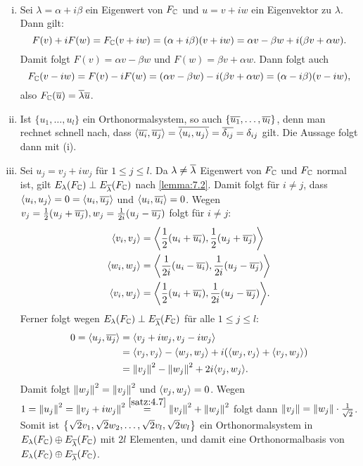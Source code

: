 \begin{beweis}
	\mbox{} \\[-.9cm]
	\begin{enumerate}[(i)]
		\item Sei $\lambda = \alpha + i \beta$ ein Eigenwert von $F_{\mathbb{C}}$ und $u = v+iw$ ein Eigenvektor zu $\lambda$.
		Dann gilt:
		\[
			F(v) + i F(w) = F_{\mathbb{C}}(v+iw) = (\alpha + i\beta)(v+iw) = \alpha v - \beta w +i(\beta v + \alpha w).
		\]
		Damit folgt $F(v) = \alpha v - \beta w$ und $F(w) = \beta v + \alpha w$.
		\newpage
		Dann folgt auch
		\[
			F_{\mathbb{C}}(v-iw) = F(v) - iF(w) = (\alpha v - \beta w)-i(\beta v + \alpha w) = (\alpha - i\beta)(v-iw),
		\]
		also $F_{\mathbb{C}}(\overline{u}) = \overline{\lambda} \overline{u}$.
		\item Ist $\{u_1,\dots,u_l\}$ ein Orthonormalsystem, so auch $\{\overline{u_1},\dots,\overline{u_l}\}$, denn man rechnet schnell nach, dass $\left\langle\overline{u_i},\overline{u_j}\right\rangle = \overline{\left\langle u_i,u_j\right\rangle} = \overline{\delta_{ij}} = \delta_{ij}$ gilt.
		Die Aussage folgt dann mit (i).
		\item Sei $u_j = v_j + iw_j$ für $1 \leq j \leq l$.
		Da $\lambda \neq \overline{\lambda}$ Eigenwert von $F_{\mathbb{C}}$ und $F_{\mathbb{C}}$ normal ist, gilt $E_{\lambda}(F_{\mathbb{C}}) \perp E_{\overline{\lambda}}(F_{\mathbb{C}})$ nach \autoref{lemma:7.2}.
		Damit folgt für $i \neq j$, dass $\left\langle u_i,u_j\right\rangle = 0 = \left\langle u_i,\overline{u_j}\right\rangle$ und $\left\langle u_i,\overline{u_i}\right\rangle = 0$.
		Wegen $v_j = \frac{1}{2}(u_j + \overline{u_j}), w_j = \frac{1}{2i}(u_j - \overline{u_j})$ folgt für $i \neq j$:
		\begin{align*}
			\sk{v_i,v_j} &= \sk{\frac{1}{2}(u_i+\ol{u_i}),\frac{1}{2}(u_j+\ol{u_j})} \\
			\sk{w_i,w_j} &= \sk{\frac{1}{2i}(u_i-\ol{u_i}),\frac{1}{2i}(u_j-\ol{u_j})} \\
			\sk{v_i,w_j} &= \sk{\frac{1}{2}(u_i+\ol{u_i}),\frac{1}{2i}(u_j-\ol{u_j})}.
		\end{align*}
		Ferner folgt wegen $E_{\lambda}(F_{\mathbb{C}}) \perp E_{\overline{\lambda}}(F_{\mathbb{C}})$ für alle $1 \leq j \leq l$:
		\begin{align*}
			0 = \sk{u_j,\ol{u_j}} &= \sk{v_j + iw_j,v_j -iw_j} \\
			&= \sk{v_j,v_j} - \sk{w_j,w_j} + i(\sk{w_j,v_j} + \sk{v_j,w_j}) \\
			&= \no{v_j}^2 - \no{w_j}^2 + 2i \sk{v_j,w_j}.
		\end{align*}
		Damit folgt $\left\lVert w_j\right\rVert^2 = \left\lVert v_j\right\rVert^2$ und $\left\langle v_j,w_j\right\rangle = 0$.
		Wegen $1 = \left\lVert u_j\right\rVert^2 = \left\lVert v_j+iw_j\right\rVert^2 \stackrel{\ref{satz:4.7}}{=} \left\lVert v_j\right\rVert^2 + \left\lVert w_j\right\rVert^2$ folgt dann $\left\lVert v_j\right\rVert = \left\lVert w_j\right\rVert \cdot \frac{1}{\sqrt{2}}$.
		Somit ist $\left\{\sqrt{2} v_1, \sqrt{2} w_2, \dots, \sqrt{2} v_l,\sqrt{2} w_l\right\}$ ein Orthonormalsystem in $E_{\lambda}(F_{\mathbb{C}}) \oplus E_{\overline{\lambda}}(F_{\mathbb{C}})$ mit $2l$ Elementen, und damit eine Orthonormalbasis von $E_{\lambda}(F_{\mathbb{C}}) \oplus E_{\overline{\lambda}}(F_{\mathbb{C}})$. \qedhere
	\end{enumerate}
\end{beweis}

